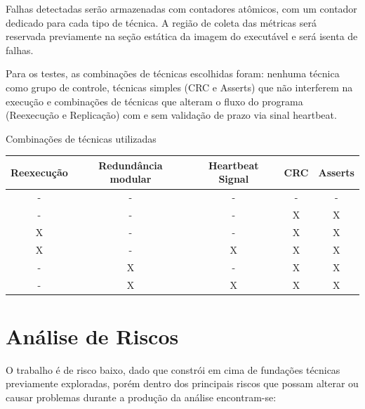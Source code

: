Falhas detectadas serão armazenadas com contadores atômicos, com um contador dedicado para cada tipo de técnica. A região de coleta das métricas será reservada previamente na seção estática da imagem do executável e será isenta de falhas.

Para os testes, as combinações de técnicas escolhidas foram: nenhuma técnica como grupo de controle, técnicas simples (CRC e Asserts) que não interferem na execução e combinações de técnicas que alteram o fluxo do programa (Reexecução e Replicação) com e sem validação de prazo via sinal heartbeat.

\begin{quadro}[H]
    \centering
    \caption{Combinações de técnicas utilizadas}
    \begin{tabular}{|c|c|c|c|c|}
        \hline
        \rowcolor[HTML]{C0C0C0}
        \textbf{Reexecução} & \textbf{Redundância modular} & \textbf{Heartbeat Signal} & \textbf{CRC} & \textbf{Asserts} \\
        \hline
        - & - & - & - & - \\
        \hline
        - & - & - & X & X \\
        \hline
        X & - & - & X & X \\
        \hline
        X & - & X & X & X \\
        \hline
        - & X & - & X & X \\
        \hline
        - & X & X & X & X \\
        \hline
    \end{tabular}
    \label{tab:combinacoesTecnicas}
\end{quadro}


\section{Análise de Riscos} \label{sec:analiseRiscos}

O trabalho é de risco baixo, dado que constrói em cima de fundações técnicas previamente exploradas, porém dentro dos principais riscos que possam alterar ou causar problemas durante a produção da análise encontram-se:

